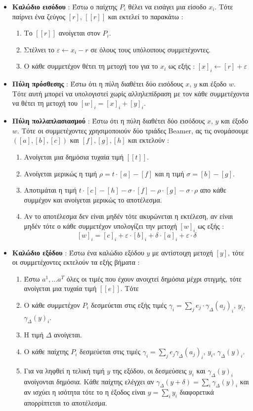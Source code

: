 \begin{itemize}
    \item \textbf{Καλώδιο εισόδου} : Έστω ο παίχτης $P_i$ θέλει να εισάγει μια είσοδο $x_i$. Τότε παίρνει ένα ζεύγος $[r]$, $[[r]]$ και εκτελεί το παρακάτω :
    \begin{enumerate}
        \item Το $[[r]]$ ανοίγεται στον $P_i$.
        \item Στέλνει το $ε \gets x_i - r$ σε όλους τους υπόλοιπους συμμετέχοντες.
        \item Ο κάθε συμμετέχον θέτει τη μετοχή του για το $x_i$ ως εξής : $[x]_i \gets [r] + ε$
    \end{enumerate}
    \item \textbf{Πύλη πρόσθεσης} : Έστω ότι η πύλη διαθέτει δύο εισόδους $x$, $y$ και έξοδο $w$. Τότε αυτή μπορεί να υπολογιστεί χωρίς αλληλεπίδραση με τον κάθε συμμετέχοντα να θέτει τη μετοχή του $[w]_i = [x]_i + [y]_i$.
    \item \textbf{Πύλη πολλαπλασιασμού} : Έστω ότι η πύλη διαθέτει δύο εισόδους $x$, $y$ και έξοδο $w$. Τότε οι συμμετέχοντες χρησιμοποιούν δύο τριάδες Beamer, ας τις ονομάσουμε $([a], [b], [c])$ και $[f], [g], [h]$ και εκτελούν :
    \begin{enumerate}
        \item Ανοίγεται μια δημόσια τυχαία τιμή $[[t]]$.
        \item Ανοίγεται μερικώς η τιμή $ρ = t \cdot [a] - [f]$ και η τιμή $σ=[b]-[g]$.
        \item Αποτιμάται η τιμή $t \cdot [c] - [h] - σ \cdot [f] - ρ \cdot [g] - σ \cdot ρ$ απο κάθε συμμέχον και ανοίγεται μερικώς το αποτέλεσμα.
        \item Αν το αποτέλεσμα δεν είναι μηδέν τότε ακυρώνεται η εκτέλεση, αν είναι μηδέν τότε ο κάθε συμμετέχον υπολογίζει την μετοχή $[w]_i$ ως εξής :
        \[
            [w]_i = [c]_i + ε \cdot [b]_i + δ \cdot [a]_i + ε \cdot δ
        \]
    \end{enumerate}
    \item \textbf{Καλώδιο εξόδου} : Έστω ένα καλώδιο εξόδου $y$ με αντίστοιχη μετοχή $[y]$, τότε οι συμμετέχοντες εκτελούν τα εξής βήματα :
    \begin{enumerate}
        \item Έστω $a^1, \ldots a^T$ όλες οι τιμές που έχουν ανοιχτεί δημόσια μέχρι στιγμής, τότε ανοίγεται μια τυχαία τιμή $[[e]]$. Τότε
        \item Ο κάθε συμμετέχον $P_i$ δεσμεύεται στις εξής τιμές $γ_i = \sum_j e_j \cdot γ_Δ(a_j)_i$, $y_i$, $γ_Δ(y)_i$.
        \item Η τιμή $Δ$ ανοίγεται.
        \item Ο κάθε παίχτης $P_i$ δεσμεύεται στις τιμές $γ_i = \sum_j e_jγ_Δ(a_j)_i$, $y_i$, $γ_Δ(y)_i$.
        \item Για να ληφθεί η τελική τιμή $y$ της εξόδου, οι δεσμεύσεις $y_i$ και $γ_Δ(y)_i$ ανοίγονται δημόσια. Κάθε παίχτης ελέγχει αν $γ_Δ(y+δ) = \sum_i γ_Δ(y)_i$ και αν ισχύει η ισότητα τότε το η έξοδος είναι $y = \sum_i y_i$ διαφορετικά απορρίπτεται το αποτέλεσμα.
    \end{enumerate}
\end{itemize}